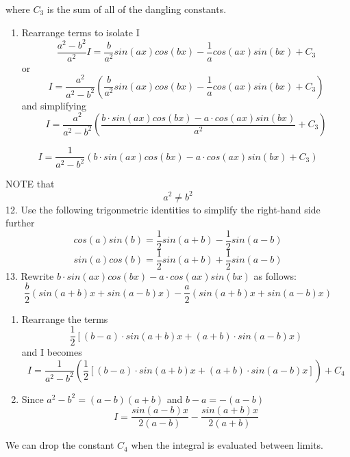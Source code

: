 \documentclass[11pt]{article}
\makeatletter
\providecommand{\tightlist}{%
      \setlength{\itemsep}{0pt}\setlength{\parskip}{0pt}}
\newcommand{\boxspacing}{\kern\kvtcb@left@rule\kern\kvtcb@boxsep}
\newcommand{\prompt}[4]{
        {\ttfamily\llap{{\color{#2}[#3]:\hspace{3pt}#4}}\vspace{-\baselineskip}}
    }
\makeatother
\begin{document}
where \({C_3}\) is the sum of all of the dangling constants.

\begin{enumerate}
\def\labelenumi{\arabic{enumi}.}
\setcounter{enumi}{10}
\tightlist
\item
  Rearrange terms to isolate I
  \[\frac{a^2-b^2}{a^2} I = \frac{b}{a^2} sin(ax) cos(bx) - \frac {1}{a}cos(ax) sin(bx) + C_3\]
  or
  \[I = \frac{a^2}{a^2-b^2} \left( \frac{b}{a^2} sin(ax) cos(bx) - \frac {1}{a}cos(ax) sin(bx) + C_3\right)\]
  and simplifying
  \[I = \frac{a^2}{a^2-b^2} \left( \frac {b \cdot sin(ax) cos(bx) - a \cdot cos(ax) sin(bx)}{a^2} + C_3 \right)\]
\end{enumerate}

\[I = \frac{1}{a^2-b^2} \left(b \cdot sin(ax) cos(bx) - a \cdot cos(ax) sin(bx) + C_3 \right)\]

NOTE that \[{a^2} \neq {b^2}\] 12. Use the following trigonmetric
identities to simplify the right-hand side further
\[cos(a)sin(b) = \frac{1}{2}sin(a+b) - \frac{1}{2}sin(a-b)\]
\[sin(a)cos(b) = \frac{1}{2}sin(a+b) + \frac{1}{2}sin(a-b)\] 13. Rewrite
\(b \cdot sin(ax) cos(bx) - a \cdot cos(ax) sin(bx)\) as follows:
\[\frac{b}{2} \left(sin(a+b)x + sin(a-b)x \right) -\frac{a}{2} \left(sin(a+b)x + sin(a-b)x \right)\]

\begin{enumerate}
\def\labelenumi{\arabic{enumi}.}
\setcounter{enumi}{12}
\item
  Rearrange the terms
  \[\frac{1}{2} \left[(b-a) \cdot sin(a+b)x + (a+b) \cdot sin(a-b)x \right)\]
  and I becomes
  \[I = \frac{1}{a^2 - b^2} \left(\frac{1}{2} \left[(b-a) \cdot sin(a+b)x + (a+b) \cdot sin(a-b)x \right] \right) + {C_4}\]
\item
  Since \({a^2} - {b^2} = (a-b)(a+b)\) and \(b-a = - \left(a-b\right)\)
  \[I = \frac{sin(a-b)x}{2(a-b)} - \frac{sin(a+b)x}{2(a+b)}\]
\end{enumerate}

We can drop the constant \({C_4}\) when the integral is evaluated
between limits.

    \begin{tcolorbox}[breakable, size=fbox, boxrule=1pt, pad at break*=1mm,colback=cellbackground, colframe=cellborder]
\prompt{In}{incolor}{ }{\boxspacing}
\begin{Verbatim}[commandchars=\\\{\}]

\end{Verbatim}
\end{tcolorbox}


    
    
    
\end{document}
